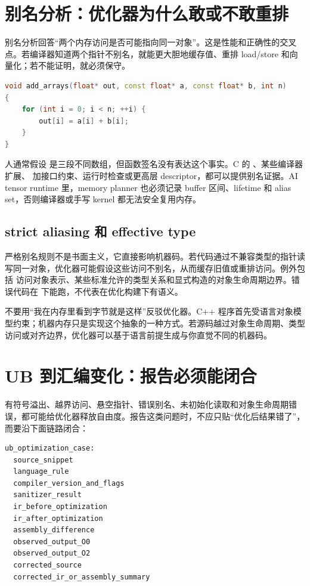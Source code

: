 \section{别名分析：优化器为什么敢或不敢重排}

别名分析回答“两个内存访问是否可能指向同一对象”。这是性能和正确性的交叉点。若编译器知道两个指针不别名，就能更大胆地缓存值、重排 load/store 和向量化；若不能证明，就必须保守。

\begin{lstlisting}[language=C++,caption={别名会阻止简单缓存}]
void add_arrays(float* out, const float* a, const float* b, int n)
{
    for (int i = 0; i < n; ++i) {
        out[i] = a[i] + b[i];
    }
}
\end{lstlisting}

人通常假设  是三段不同数组，但函数签名没有表达这个事实。C 的 、某些编译器扩展、 加接口约束、运行时检查或更高层 descriptor，都可以提供别名证据。AI tensor runtime 里，memory planner 也必须记录 buffer 区间、lifetime 和 alias set，否则编译器或手写 kernel 都无法安全复用内存。

\subsection{strict aliasing 和 effective type}

严格别名规则不是书面主义，它直接影响机器码。若代码通过不兼容类型的指针读写同一对象，优化器可能假设这些访问不别名，从而缓存旧值或重排访问。例外包括  访问对象表示、某些标准允许的类型关系和显式构造的对象生命周期边界。错误代码在  下能跑，不代表在优化构建下有语义。

\begin{warningbox}
不要用“我在内存里看到字节就是这样”反驳优化器。C++ 程序首先受语言对象模型约束；机器内存只是实现这个抽象的一种方式。若源码越过对象生命周期、类型访问或对齐边界，优化器可以基于语言前提生成与你直觉不同的机器码。
\end{warningbox}

\section{UB 到汇编变化：报告必须能闭合}

有符号溢出、越界访问、悬空指针、错误别名、未初始化读取和对象生命周期错误，都可能给优化器释放自由度。报告这类问题时，不应只贴“优化后结果错了”，而要沿下面链路闭合：

\begin{lstlisting}[numbers=none,caption={UB 优化事故报告模板}]
ub_optimization_case:
  source_snippet
  language_rule
  compiler_version_and_flags
  sanitizer_result
  ir_before_optimization
  ir_after_optimization
  assembly_difference
  observed_output_O0
  observed_output_O2
  corrected_source
  corrected_ir_or_assembly_summary
\end{lstlisting}

